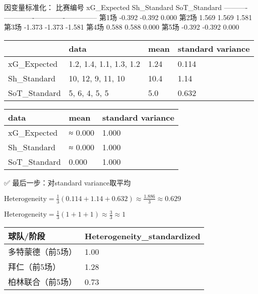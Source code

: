 \documentclass[
]{ctexart}
\begin{document}
因变量标准化： \textbar{} 比赛编号 \textbar{} xG\_Expected \textbar{}
Sh\_Standard \textbar{} SoT\_Standard \textbar{}
\textbar----------\textbar-------------\textbar-------------\textbar--------------\textbar{}
\textbar{} 第1场 \textbar{} -0.392 \textbar{} -0.392 \textbar{} 0.000
\textbar{} \textbar{} 第2场 \textbar{} 1.569 \textbar{} 1.569 \textbar{}
1.581 \textbar{} \textbar{} 第3场 \textbar{} -1.373 \textbar{} -1.373
\textbar{} -1.581 \textbar{} \textbar{} 第4场 \textbar{} 0.588
\textbar{} 0.588 \textbar{} 0.000 \textbar{} \textbar{} 第5场 \textbar{}
-0.392 \textbar{} -0.392 \textbar{} 0.000 \textbar{}

\begin{longtable}[]{@{}llll@{}}
\toprule\noalign{}
& data & mean & standard variance \\
\midrule\noalign{}
\endhead
\bottomrule\noalign{}
\endlastfoot
xG\_Expected & 1.2, 1.4, 1.1, 1.3, 1.2 & 1.24 & 0.114 \\
Sh\_Standard & 10, 12, 9, 11, 10 & 10.4 & 1.14 \\
SoT\_Standard & 5, 6, 4, 5, 5 & 5.0 & 0.632 \\
\end{longtable}

\begin{longtable}[]{@{}lll@{}}
\toprule\noalign{}
data & mean & standard variance \\
\midrule\noalign{}
\endhead
\bottomrule\noalign{}
\endlastfoot
xG\_Expected & ≈ 0.000 & 1.000 \\
Sh\_Standard & ≈ 0.000 & 1.000 \\
SoT\_Standard & 0.000 & 1.000 \\
\end{longtable}

✅ 最后一步：对standard variance取平均

\(\text{Heterogeneity} = \frac{1}{3} (0.114 + 1.14 + 0.632) \approx \frac{1.886}{3} \approx 0.629\)

\(\text{Heterogeneity} = \frac{1}{3} (1 + 1 + 1) \approx \frac{3}{3} \approx 1\)

\begin{longtable}[]{@{}ll@{}}
\toprule\noalign{}
球队/阶段 & Heterogeneity\_standardized \\
\midrule\noalign{}
\endhead
\bottomrule\noalign{}
\endlastfoot
多特蒙德（前5场） & 1.00 \\
拜仁（前5场） & 1.28 \\
柏林联合（前5场） & 0.73 \\
\end{longtable}
\end{document}
